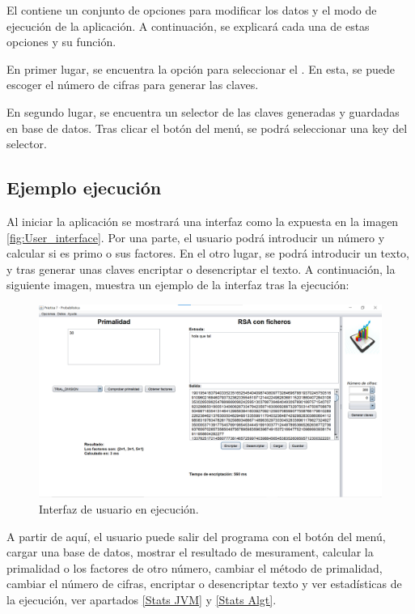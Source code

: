 El  contiene un conjunto de opciones para modificar los datos y el modo de ejecución de la aplicación. A continuación, se explicará cada una de estas opciones y su función.\bigskip

En primer lugar, se encuentra la opción para seleccionar el . En esta, se puede escoger el número de cifras para generar las claves.\bigskip

En segundo lugar, se encuentra un selector de las claves generadas y guardadas en base de datos. Tras clicar el botón  del menú, se podrá seleccionar una key del selector. 

\subsection{Ejemplo ejecución}

Al iniciar la aplicación se mostrará una interfaz como la expuesta en la imagen \ref{fig:User_interface}. Por una parte, el usuario podrá introducir un número y calcular si es primo o sus factores. En el otro lugar, se podrá introducir un texto, y tras generar unas claves encriptar o desencriptar el texto. A continuación, la siguiente imagen, muestra un ejemplo de la interfaz tras la ejecución:

\begin{figure}[!h]
    \centering
    \includegraphics[width=\linewidth]{Usage/img/ejecucion.png}
    \caption{Interfaz de usuario en ejecución.}
    \label{fig:Ejemplo ejecución}
\end{figure}


A partir de aquí, el usuario puede salir del programa con el botón del menú, cargar una base de datos, mostrar el resultado de mesurament, calcular la primalidad o los factores de otro número, cambiar el método de primalidad, cambiar el número de cifras, encriptar o desencriptar texto y ver estadísticas de la ejecución, ver apartados \ref{Stats JVM} y \ref{Stats Algt}.

